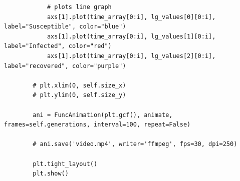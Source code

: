 \documentclass[11pt, a4paper]{article}
\begin{document}
\begin{lstlisting}
            # plots line graph
            axs[1].plot(time_array[0:i], lg_values[0][0:i], label="Susceptible", color="blue")
            axs[1].plot(time_array[0:i], lg_values[1][0:i], label="Infected", color="red")
            axs[1].plot(time_array[0:i], lg_values[2][0:i], label="recovered", color="purple")

        # plt.xlim(0, self.size_x)
        # plt.ylim(0, self.size_y)

        ani = FuncAnimation(plt.gcf(), animate, frames=self.generations, interval=100, repeat=False)

        # ani.save('video.mp4', writer='ffmpeg', fps=30, dpi=250)

        plt.tight_layout()
        plt.show()

\end{lstlisting}
\end{document}
